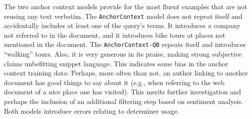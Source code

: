 \documentclass[sigconf]{acmart}
\begin{document}
The two anchor context models provide for the most fluent examples that are not reusing any text verbatim. The {\small\tt AnchorContext} model does not repeat itself and accidentally includes at least one of the query's terms. It introduces a company not referred to in the document, and it introduces bike tours at places not mentioned in the document. The {\small\tt AnchorContext-QB} repeats itself and introduces ``walking'' tours. Also, it is very generous in its praise, making strong subjective claims unbefitting snippet language. This indicates some bias in the anchor context training data: Perhaps, more often than not, an author linking to another document has good things to say about it (e.g., when referring to the web document of a nice place one has visited). This merits further investigation and perhaps the inclusion of an additional filtering step based on sentiment analysis. Both models introduce errors relating to determiner usage.
\end{document}

